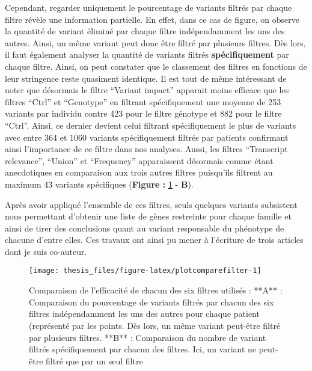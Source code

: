 \documentclass[12pt,twoside]{reedthesis}
\theoremstyle{definition}
\theoremstyle{definition}
\theoremstyle{remark}
\begin{document}
  Cependant, regarder uniquement le pourcentage de variants filtrés par
  chaque filtre révèle une information partielle. En effet, dans ce cas de
  figure, on observe la quantité de variant éliminé par chaque filtre
  indépendamment les uns des autres. Ainsi, un même variant peut donc être
  filtré par plusieurs filtres. Dès lors, il faut également analyser la
  quantité de variants filtrés \textbf{spécifiquement} par chaque filtre.
  Ainsi, on peut constater que le classement des filtres en fonctions de
  leur stringence reste quasiment identique. Il est tout de même
  intéressant de noter que désormais le filtre ``Variant impact'' apparait
  moins efficace que les filtres ``Ctrl'' et ``Genotype'' en filtrant
  spécifiquement une moyenne de 253 variants par individu contre 423 pour
  le filtre génotype et 882 pour le filtre ``Ctrl''. Ainsi, ce dernier
  devient celui filtrant spécifiquement le plus de variants avec entre 364
  et 1060 variants spécifiquement filtrés par patients confirmant ainsi
  l'importance de ce filtre dans nos analyses. Aussi, les filtres
  ``Transcript relevance'', ``Union'' et ``Frequency'' apparaissent
  désormais comme étant anecdotiques en comparaison aux trois autres
  filtres puisqu'ils filtrent au maximum 43 variants spécifiques
  (\textbf{Figure :} \ref{fig:plotcomparefilter} - \textbf{B}).
  
  Après avoir appliqué l'ensemble de ces filtres, seuls quelques variants
  subsistent nous permettant d'obtenir une liste de gènes restreinte pour
  chaque famille et ainsi de tirer des conclusions quant au variant
  responsable du phénotype de chacune d'entre elles. Ces travaux ont ainsi
  pu mener à l'écriture de trois articles dont je suis co-auteur.
  
  \newpage
  
  \begin{figure}
  
  {\centering \texttt{[image: thesis\_files/figure-latex/plotcomparefilter-1]} 
  
  }
  
  \caption[Comparaison de l'efficacité de chacun des six filtres utilisés]{Comparaison de l'efficacité de chacun des six filtres utilisés : **A** : Comparaison du pourcentage de variants filtrés par chacun des six filtres indépendamment les uns des autres pour chaque patient (représenté par les points. Dès lors, un même variant peut-être filtré par plusieurs filtres. **B** : Comparaison du nombre de variant filtrés spécifiquement par chacun des filtres. Ici, un variant ne peut-être filtré que par un seul filtre}\label{fig:plotcomparefilter}
  \end{figure}
  
\end{document}
